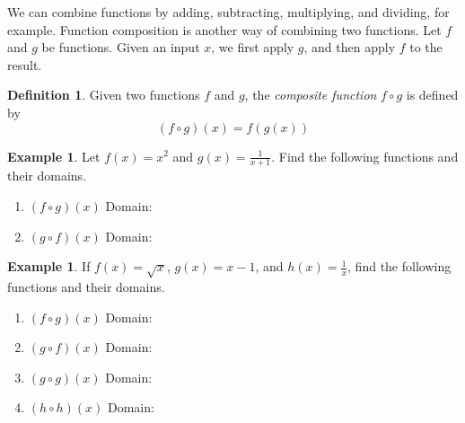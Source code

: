 \documentclass[letterpaper,12pt,oneside]{book}
\theoremstyle{definition}
\newtheorem{definition}[theorem]{Definition}
\newtheorem{example}[theorem]{Example}
\newcommand{\dsp}{\displaystyle}
\begin{document}
{We can combine functions by adding, subtracting, multiplying, and dividing, for example.  Function composition is another way of combining two functions.  Let $f$ and $g$ be functions.  Given an input $x$, we first apply $g$, and then apply $f$ to the result.  

\begin{center}
\end{center}

\begin{definition}
Given two functions $f$ and $g$, the \emph{composite function} $f\circ g$ is defined by
\[
(f\circ g)(x)=f(g(x))
\]
\end{definition}

\begin{example}
Let $f(x)=x^2$ and $g(x)=\dsp\frac{1}{x+1}$.  Find the following functions and their domains.
\begin{enumerate}
\item $(f\circ g)(x)$ \hfill Domain: \hspace{3cm}
\vfill
\item $(g\circ f)(x)$ \hfill Domain: \hspace{3cm}
\vfill
\end{enumerate}
\end{example}

\begin{example}
If $f(x)=\sqrt{x}$, $g(x)=x-1$, and $h(x)=\frac{1}{x}$, find the following functions and their domains.
\begin{enumerate}
\item $(f\circ g)(x)$ \hfill Domain: \hspace{3cm}
\vfill
\item $(g\circ f)(x)$ \hfill Domain: \hspace{3cm}
\vfill
\item $(g\circ g)(x)$ \hfill Domain: \hspace{3cm}
\vfill
\item $(h\circ h)(x)$ \hfill Domain: \hspace{3cm}
\vfill
\end{enumerate}
\end{example}

}
\end{document}
